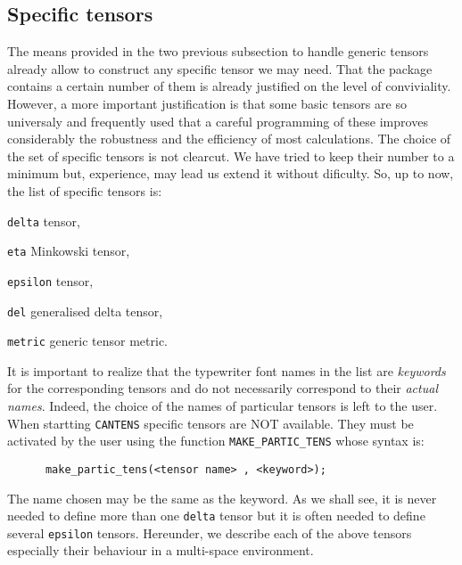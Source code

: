 \subsection{Specific tensors}
The means provided in the two previous subsection to handle generic tensors
already allow to construct any specific tensor we may need.  That the package contains
a certain number of them  is already justified on the level of conviviality.
However, a more important justification is that some basic tensors are so 
universaly and frequently used that a careful programming of these improves 
considerably the robustness and the efficiency of most calculations. 
The choice of the set of specific tensors is not clearcut. We have tried 
to keep their number to a minimum but, experience, may lead us extend it 
without dificulty. So, up to now, the list of specific tensors is:
\begin{list}{-}{\parsep 0in \itemsep 1pt}     
\item \texttt{delta} tensor,
\item \texttt{eta} Minkowski tensor,
\item \texttt{epsilon} tensor,
\item \texttt{del} generalised delta tensor,
\item \texttt{metric} generic tensor metric.    
\end{list}
It is important to realize that the typewriter font names in the list are 
\emph{keywords} for the corresponding tensors and do not necessarily correspond 
to their \emph{actual names}.  
Indeed, the choice of the names of particular tensors is left to the user.
When startting \texttt{CANTENS} specific tensors are NOT 
available.
They must be activated by the user using the function 
\texttt{MAKE\_PARTIC\_TENS} whose syntax is:
\begin{verbatim}
      make_partic_tens(<tensor name> , <keyword>);
\end{verbatim}
The name chosen may be the same as the keyword.
As we shall see, it is never needed to define more than one \texttt{delta} 
tensor but it is often needed to define several \texttt{epsilon} tensors. 
Hereunder, we describe each of the above tensors especially their 
behaviour in a multi-space environment.

